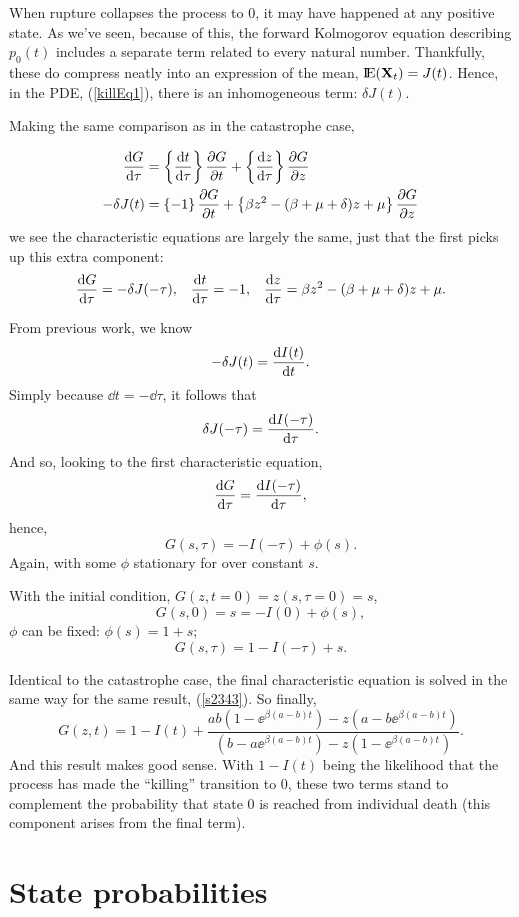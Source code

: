 When rupture collapses the process to 0, it may have happened at any positive state.  As we've seen, because of this, the forward Kolmogorov equation describing $p_0(t)$ includes a separate term related to every natural number. Thankfully, these do compress neatly into an expression of the mean, ${\rm I}\!{\rm E}({{\bf X}_t}) = J(t)$. Hence, in the PDE, (\ref{killEq1}), there is an inhomogeneous term: $\delta J(t)$.\par
Making the same comparison as in the catastrophe case, 

\begin{align*}
\displaystyle\frac{{\rm d} G}{{\rm d} \tau} &=  \left\{\displaystyle\frac{{\rm d} t}{{\rm d} \tau}\right\}  \displaystyle\frac{\partial G}{\partial t}+ \left\{\displaystyle\frac{{\rm d} z}{{\rm d} \tau} \right\}\displaystyle\frac{\partial G}{\partial z}\\
-\delta J(t)&=  \left\{- 1\right\}\displaystyle\frac{\partial G}{\partial t} + \left\{\beta z^2 -( \beta + \mu + \delta)z + \mu\right\} \displaystyle\frac{\partial G}{\partial z}
\end{align*}
we see the characteristic equations are largely the same, just that the first picks up this extra component: 
\begin{align*}
\label{Char2}
\displaystyle\frac{{\rm d} G}{{\rm d} \tau} = -\delta J(-\tau),&& \displaystyle\frac{{\rm d} t}{{\rm d} \tau} = -1, && \displaystyle\frac{{\rm d} z}{{\rm d} \tau} = \beta z^2 - (\beta + \mu + \delta)z + \mu.
\end{align*}



\noindent
From previous work, we know 
$$-\delta J(t) = \displaystyle\frac{{\rm d} I(t)}{{\rm d} t}.$$
Simply because $\dd t = -\dd \tau$, it follows that 
$$\delta J(-\tau) = \displaystyle\frac{{\rm d} I(-\tau)}{{\rm d} \tau}.$$
And so, looking to the first characteristic equation, 
$$\displaystyle\frac{{\rm d} G}{{\rm d} \tau} = \displaystyle\frac{{\rm d} I(-\tau)}{{\rm d} \tau},$$
hence,
$$G(s,\tau) = -I(-\tau) + \phi(s).$$
Again, with some $\phi$ stationary for over constant $s$. \par
With the initial condition, $G(z, t=0) = z(s, \tau = 0) = s$,
$$G(s,0) =s= -I(0) + \phi(s),$$
$\phi$ can be fixed: $\phi(s) = 1 + s;$
$$G(s,\tau) = 1 - I(-\tau) + s.$$\par
Identical to the catastrophe case, the final characteristic equation is solved in the same way for the same result, (\ref{s2343}). So finally, 
$$G(z,t) = 1 - I(t)  + \frac{ab(1-\ee^{\beta(a-b) t}) - z(a-b\ee^{\beta(a-b) t}) } {  (b-a\ee^{\beta(a-b) t}) -z(1-\ee^{\beta(a-b) t})  }.$$
And this result makes good sense. With $1 - I(t)$ being the likelihood that the process has made the ``killing'' transition to 0, these two terms stand to complement the probability that state $0$ is reached from individual death (this component arises from the final term). 


\section{State probabilities}

